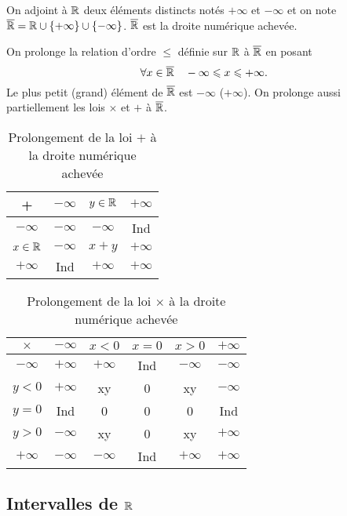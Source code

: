   \begin{defdef}
  On adjoint à \(\mathbb{R}\) deux éléments distincts notés \( + \infty\) et \( -
\infty\) et on note \(\overline{\mathbb{R}} = \mathbb{R}\cup\{ + \infty\}\cup\{ - \infty\}\).
\(\overline{\mathbb{R}}\) est la droite numérique achevée.  \end{defdef}
On prolonge la relation d'ordre \(\leqslant\) définie sur \(\mathbb{R}\) à \(\overline{\mathbb{R}}\)
en posant
\begin{equation}
  \forall x\in \overline{\mathbb{R}} \quad -\infty\leqslant x\leqslant +\infty.
\end{equation}
Le plus petit (grand) élément de \(\overline{\mathbb{R}}\) est \( - \infty\) (\( + \infty\)).
On prolonge aussi partiellement les lois \(\times\) et \( + \) à \(\overline{\mathbb{R}}\).
\begin{table}[!h]
  \centering
  \begin{tabular}{|c|c|c|c|}\hline
    + & \( - \infty\) & \(y\in\mathbb{R}\) & \( + \infty\) \\ \hline
    \( - \infty\) & \( - \infty\) & \( - \infty\)& Ind \\ \hline
    \(x\in\mathbb{R}\) & \( - \infty\) & \(x + y\) & \( + \infty\) \\ \hline
  \( + \infty\) & Ind & \( + \infty\) & \( + \infty\) \\ \hline \end{tabular}
  \caption{Prolongement de la loi \( + \) à la droite numérique achevée}
\end{table}
\begin{table}[!h]
  \centering
  \begin{tabular}{|c|c|c|c|c|c|}\hline
    \(\times\) & \( - \infty\) & \(x<0\) & \(x = 0\) & \(x>0\) & \( + \infty\)
    \\ \hline
    \( - \infty\) & \( + \infty\)& \( + \infty\)& Ind& \( - \infty\)& \( -
    \infty\)\\ \hline
    \(y<0\) &\( + \infty\) & xy& 0& xy& \( - \infty\)\\ \hline
    \(y = 0\) & Ind& 0& 0& 0&Ind \\ \hline
    \(y>0\) & \( - \infty\)& xy& 0& xy& \( + \infty\)\\ \hline
  \( + \infty\) & \( - \infty\)& \( - \infty\)& Ind& \( + \infty\) & \( +
\infty\)\\ \hline \end{tabular}
\caption{Prolongement de la loi \(\times\) à la droite numérique achevée}
\end{table}

\subsection{Intervalles de \(\mathbb{R}\)}

